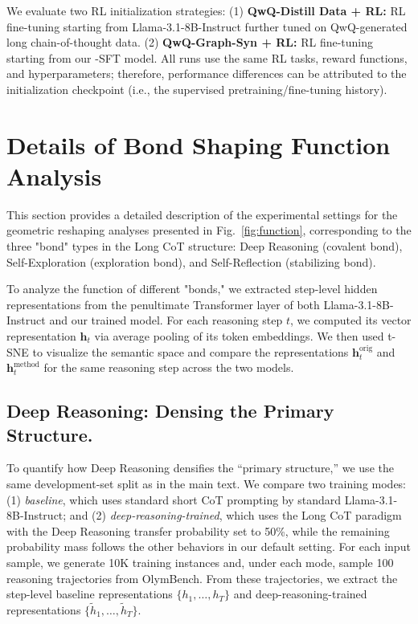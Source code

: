 We evaluate two RL initialization strategies:
(1) \textbf{QwQ-Distill Data + RL:} RL fine-tuning starting from Llama-3.1-8B-Instruct further tuned on QwQ-generated long chain-of-thought data.
(2) \textbf{QwQ-Graph-Syn + RL:} RL fine-tuning starting from our \method-SFT model.
All runs use the same RL tasks, reward functions, and hyperparameters; therefore, performance differences can be attributed to the initialization checkpoint (i.e., the supervised pretraining/fine-tuning history).



\section{Details of Bond Shaping Function Analysis}
\label{app:bond_shaping_setting}

This section provides a detailed description of the experimental settings for the geometric reshaping analyses presented in Fig.~\ref{fig:function}, corresponding to the three "bond" types in the Long CoT structure: Deep Reasoning (covalent bond), Self-Exploration (exploration bond), and Self-Reflection (stabilizing bond).

To analyze the function of different "bonds," we extracted step-level hidden representations from the penultimate Transformer layer of both Llama-3.1-8B-Instruct and our trained \method model. For each reasoning step \(t\), we computed its vector representation \(\mathbf{h}_t\) via average pooling of its token embeddings. We then used t-SNE to visualize the semantic space and compare the representations \(\mathbf{h}^{\text{orig}}_t\) and \(\mathbf{h}^{\text{method}}_t\) for the same reasoning step across the two models.

\subsection{Deep Reasoning: Densing the Primary Structure.}
To quantify how Deep Reasoning densifies the ``primary structure,'' we use the same development-set split as in the main text. We compare two training modes: (1) \textit{baseline}, which uses standard short CoT prompting by standard Llama-3.1-8B-Instruct; and (2) \textit{deep-reasoning-trained}, which uses the Long CoT paradigm with the Deep Reasoning transfer probability set to 50\%, while the remaining probability mass follows the other behaviors in our default setting.
For each input sample, we generate 10K training instances and, under each mode, sample 100 reasoning trajectories from OlymBench. From these trajectories, we extract the step-level baseline representations \(\{{h}_1, \dots, {h}_{T}\}\) and deep-reasoning-trained representations \(\{\tilde{h}_1, \dots, \tilde{h}_{T}\}\).


